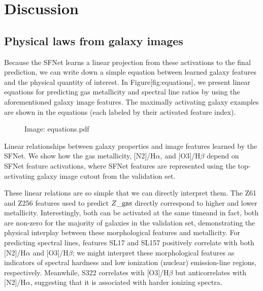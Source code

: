 \documentclass[11pt,a4paper]{article}
\begin{document}
\section{Discussion}

\subsection{Physical laws from galaxy images}

Because the SFNet learns a linear projection from these activations to the final prediction, we can write down a simple equation between learned galaxy features and the physical quantity of interest. In Figure[fig:equations], we present linear equations for predicting gas metallicity and spectral line ratios by using the aforementioned galaxy image features.
The maximally activating galaxy examples are shown in the equations (each labeled by their activated feature index).

\begin{figure}[h]
\caption{Image: equations.pdf}
\end{figure}

Linear relationships between galaxy properties and image features learned by the SFNet. We show how the gas metallicity, [N2]/H$\alpha$, and [O3]/H$\beta$ depend on SFNet feature activations, where SFNet features are represented using the top-activating galaxy image cutout from the validation set.

These linear relations are so simple that we can directly interpret them. The Z61 and Z256 features used to predict $Z\_{\rm gas}$ directly correspond to higher and lower metallicity. Interestingly, both can be activated at the same timeand in fact, both are non-zero for the majority of galaxies in the validation set, demonstrating the physical interplay between these morphological features and metallicity. For predicting spectral lines, features SL17 and SL157 positively correlate with both [N2]/H$\alpha$ and [O3]/H$\beta$; we might interpret these morphological features as indicators of spectral hardness and low ionization (nuclear) emission-line regions, respectively. Meanwhile, S322 correlates with [O3]/H$\beta$ but anticorrelates with [N2]/H$\alpha$, suggesting that it is associated with harder ionizing spectra.
\end{document}
